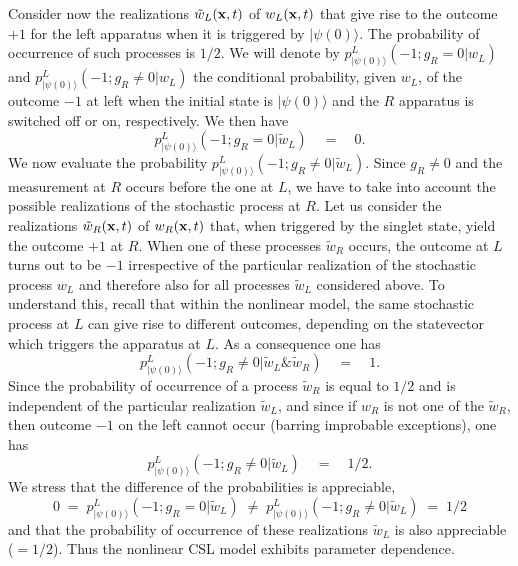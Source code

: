 \documentclass[12pt]{article}
\begin{document}
Consider now the realizations $\tilde w_{L}({\bf x}, t)$ of
$w_{L}({\bf x}, t)$ that give rise to the outcome $+ 1$ for the
left apparatus when it is triggered by $|\psi(0)\rangle$. The
probability of occurrence of such processes is $1/2$. We will
denote by $p^{L}_{|\psi(0)\rangle}(-1; g_{R} = 0|w_{L})$ and
$p^{L}_{|\psi(0)\rangle}(-1; g_{R} \neq 0|w_{L})$ the conditional
probability, given $w_{L}$, of the outcome $-1$ at left when the
initial state is $|\psi(0)\rangle$ and the $R$ apparatus is
switched off or on, respectively. We then have
\begin{equation}
p^{L}_{|\psi(0)\rangle}(-1; g_{R} = 0|\tilde w_{L}) \quad = \quad
0.
\end{equation}
We now evaluate the probability $p^{L}_{|\psi(0)\rangle}(-1; g_{R}
\neq 0|\tilde w_{L})$. Since $g_{R} \neq 0$ and the measurement at
$R$ occurs before the one at $L$, we have to take into account the
possible realizations of the stochastic process at $R$. Let us
consider the realizations $\tilde w_{R}({\bf x}, t)$ of
$w_{R}({\bf x}, t)$ that, when triggered by the singlet state,
yield the outcome $+ 1$ at $R$. When one of these processes
$\tilde w_{R}$ occurs, the outcome at $L$ turns out to be $-1$
irrespective of the particular realization of the stochastic
process $w_{L}$ and therefore also for all processes $\tilde
w_{L}$ considered above. To understand this, recall that within
the nonlinear model, the same stochastic process at $L$ can give
rise to different outcomes, depending on the statevector which
triggers the apparatus at $L$. As a consequence one has
\begin{equation}
p^{L}_{|\psi(0)\rangle}(-1; g_{R} \neq 0|\tilde w_{L} \& \tilde
w_{R}) \quad = \quad 1.
\end{equation}
Since the probability of occurrence of a process $\tilde w_{R}$ is
equal to $1/2$ and is independent of the particular realization
$\tilde w_{L}$, and since if $w_{R}$ is not one of the $\tilde
w_{R}$, then outcome $-1$ on the left cannot occur (barring
improbable exceptions), one has
\begin{equation}
p^{L}_{|\psi(0)\rangle}(-1; g_{R} \neq 0|\tilde w_{L}) \quad =
\quad 1/2.
\end{equation}
We stress that the difference of the probabilities is appreciable,
\begin{equation}
0\; = \; p^{L}_{|\psi(0)\rangle}(-1; g_{R} = 0|\tilde w_{L}) \;
\neq \;  p^{L}_{|\psi(0)\rangle}(-1; g_{R} \neq 0|\tilde w_{L})\;
= \; 1/2
\end{equation}
and that the probability of occurrence of these realizations
$\tilde w_{L}$ is also appreciable ($= 1/2$). Thus the nonlinear
CSL model exhibits parameter dependence.
\end{document}
